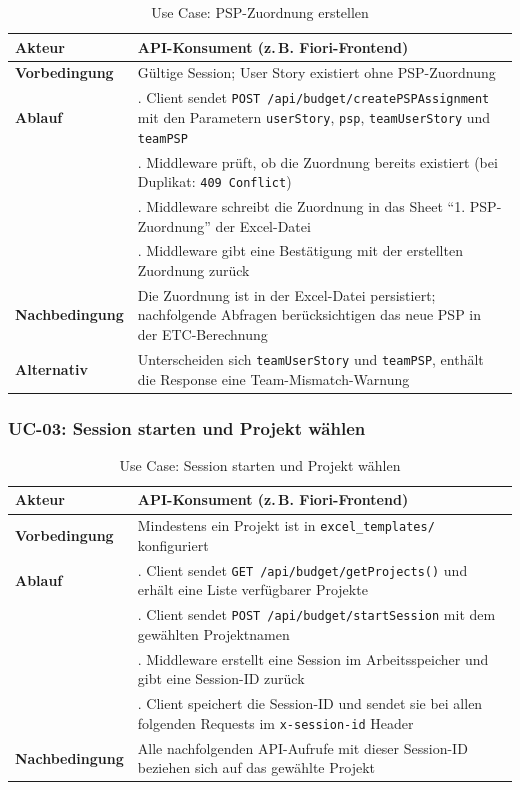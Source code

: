 \begin{table}[H]
\centering
\begin{tabularx}{\textwidth}{l>{\raggedright\arraybackslash}X}
\toprule
\textbf{Akteur} & API-Konsument (z.\,B. Fiori-Frontend) \\
\midrule
\textbf{Vorbedingung} & Gültige Session; User Story existiert ohne PSP-Zuordnung \\
\midrule
\textbf{Ablauf} &
1. Client sendet \texttt{POST /api/budget/createPSPAssignment} mit den Parametern \texttt{userStory}, \texttt{psp}, \texttt{teamUserStory} und \texttt{teamPSP} \\
& 2. Middleware prüft, ob die Zuordnung bereits existiert (bei Duplikat: \texttt{409 Conflict}) \\
& 3. Middleware schreibt die Zuordnung in das Sheet \enquote{1. PSP-Zuordnung} der Excel-Datei \\
& 4. Middleware gibt eine Bestätigung mit der erstellten Zuordnung zurück \\
\midrule
\textbf{Nachbedingung} & Die Zuordnung ist in der Excel-Datei persistiert; nachfolgende Abfragen berücksichtigen das neue PSP in der ETC-Berechnung \\
\midrule
\textbf{Alternativ} & Unterscheiden sich \texttt{teamUserStory} und \texttt{teamPSP}, enthält die Response eine Team-Mismatch-Warnung \\
\bottomrule
\end{tabularx}
\caption{Use Case: PSP-Zuordnung erstellen}
\end{table}

\subsubsection{UC-03: Session starten und Projekt wählen}

\begin{table}[H]
\centering
\begin{tabularx}{\textwidth}{l>{\raggedright\arraybackslash}X}
\toprule
\textbf{Akteur} & API-Konsument (z.\,B. Fiori-Frontend) \\
\midrule
\textbf{Vorbedingung} & Mindestens ein Projekt ist in \texttt{excel\_templates/} konfiguriert \\
\midrule
\textbf{Ablauf} &
1. Client sendet \texttt{GET /api/budget/getProjects()} und erhält eine Liste verfügbarer Projekte \\
& 2. Client sendet \texttt{POST /api/budget/startSession} mit dem gewählten Projektnamen \\
& 3. Middleware erstellt eine Session im Arbeitsspeicher und gibt eine Session-ID zurück \\
& 4. Client speichert die Session-ID und sendet sie bei allen folgenden Requests im \texttt{x-session-id} Header \\
\midrule
\textbf{Nachbedingung} & Alle nachfolgenden API-Aufrufe mit dieser Session-ID beziehen sich auf das gewählte Projekt \\
\bottomrule
\end{tabularx}
\caption{Use Case: Session starten und Projekt wählen}
\end{table}


